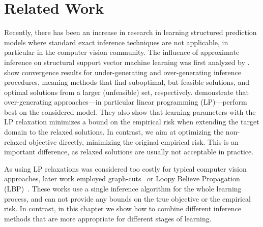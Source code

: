 \section{Related Work}



Recently, there has been an increase in research in learning structured
prediction models where standard exact inference techniques are not applicable,
in particular in the computer vision community.
The influence of approximate inference on structural support vector machine
learning was first analyzed by  \citet{finley2008training}.
\citet{finley2008training} show convergence results for under-generating and
over-generating inference procedures, meaning methods that find suboptimal, but
feasible solutions, and optimal solutions from a larger (unfeasible) set,
respectively.
\citet{finley2008training} demonstrate that over-generating approaches---in
particular linear programming (LP)---perform best on the considered model.
They also show that learning parameters with the LP relaxation minimizes a
bound on the empirical risk when extending the target domain to the relaxed
solutions.
In contrast, we aim at optimizing the non-relaxed objective directly, minimizing
the original empirical risk. This is an important difference, as relaxed solutions
are usually not acceptable in practice.

As using LP relaxations was considered too costly for typical computer vision
approaches, later work employed graph-cuts~\citep{szummer2008learning} or Loopy
Believe Propagation (LBP)~\citep{lucchi2011spatial}. These works use a single
inference algorithm for the whole learning process, and can not provide any
bounds on the true objective or the empirical risk. In contrast, in this chapter
we show how to combine different inference methods that are more appropriate
for different stages of learning.

